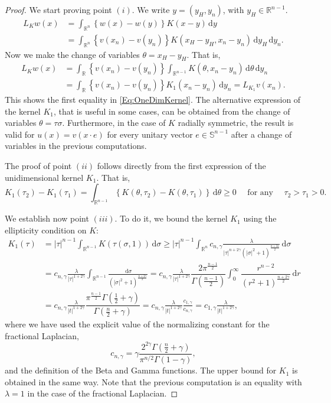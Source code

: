 \documentclass[12pt,reqno]{amsart}
\theoremstyle{definition}
\theoremstyle{remark}
\newcommand{\con}[1]{\mathbb{#1}}
\newcommand{\R}{\con{R}} %
\newcommand{\Sph}{\con{S}} %
\newcommand{\s}{\gamma}
\renewcommand{\d}{\,\mathrm{d}} %
\numberwithin{equation}{section}
\begin{document}
\begin{proof}
	We start proving point $(i)$. We write $y=(y_H,y_n)$, with $y_H\in \R^{n-1}$.
	\begin{align*}
	L_K w(x) &= \int_{\R^n} \left\{ w(x)-w(y) \right\} K(x-y) \d y \\
	&=\int_{\R^n} \left\{ v(x_n)-v(y_n) \right\} K\left(x_H-y_H,x_n-y_n\right) \d y_H \d y_n.
	\end{align*}
	Now we make the change of variables $\theta = x_H-y_H$. That is,
	\begin{align*}
	L_K w(x) 	&= \int_{\R} \left\{ v(x_n)-v(y_n) \right\} \int_{\R^{n-1}} K\left(\theta,x_n-y_n\right) \d \theta \d y_n \\
	&= \int_{\R} \left\{ v(x_n)-v(y_n) \right\} K_1(x_n-y_n ) \d y_n = L_{K_1}v(x_n).
	\end{align*}
	This shows the first equality in \eqref{Eq:OneDimKernel}. The alternative expression of the kernel $K_1$, that is useful in some cases, can be obtained from the change of variables $\theta = \tau\sigma$. Furthermore, in the case of $K$ radially symmetric, the result is valid for $u(x) = v(x\cdot e)$ for every unitary vector $e\in \Sph^{n-1}$ after a change of variables in the previous computations.
	
	The proof of point $(ii)$ follows directly from the first expression of the unidimensional kernel $K_1$. That is,
	$$ 
	K_1(\tau_2)-K_1(\tau_1) = \int_{\R^{n-1}} \left\{ K(\theta,\tau_2) - K(\theta,\tau_1)\right\} \d \theta \geq 0 \quad \text{ for any } \quad \tau_2>\tau_1>0. 
	$$
	
	We establish now point $(iii)$. To do it, we bound the kernel $K_1$ using the ellipticity condition on $K$:
	\begin{align*}
	K_1(\tau) &= |\tau|^{n-1} \int_{\R^{n-1}} K\left(\tau(\sigma,1)\right) \d\sigma \geq |\tau|^{n-1} \int_{\R^n} c_{n,\s} \frac{\lambda}{|\tau|^{n+2\s}(|\sigma|^2+1)^{\frac{n+2s}{2}}} \d\sigma \\
	&= c_{n,\s} \frac{\lambda}{|\tau|^{1+2\s}} \int_{\R^{n-1}} \frac{\d\sigma}{(|\sigma|^2+1)^{\frac{n+2\s}{2}}} = c_{n,\s} \frac{\lambda}{|\tau|^{1+2\s}} \dfrac{2 \pi^{\frac{n-1}{2}}}{\Gamma(\frac{n-1}{2})} \int_0^\infty \dfrac{r^{n-2}}{(r^2+1)^{\frac{n+2\s}{2}}} \d r \\	
	& = c_{n,\s} \frac{\lambda}{|t|^{1+2\s}} 
	\dfrac{\pi^{\frac{n-1}{2}} \Gamma(\frac{1}{2}+\s)}{\Gamma(\frac{n}{2}+\s)} 
	= c_{n,\s} \frac{\lambda}{|t|^{1+2\s}} \frac{c_{1,\s}}{c_{n,\s}} = c_{1,\s} \frac{\lambda}{|t|^{1+2\s}},
	\end{align*}
	where we have used the explicit value of the normalizing constant for the fractional Laplacian,
	\begin{equation}
	\label{Eq:ConstantFracLaplacian}
	c_{n,\s} = \s\dfrac{2^{2\s} \Gamma(\frac{n}{2}+\s) }{\pi^{n/2} \Gamma(1-\s)},
	\end{equation}
	and the definition of the Beta and Gamma functions. The upper bound for $K_1$ is obtained in the same way. Note that the previous computation is an equality with $\lambda = 1$ in the case of the fractional Laplacian.
\end{proof}
\end{document}
